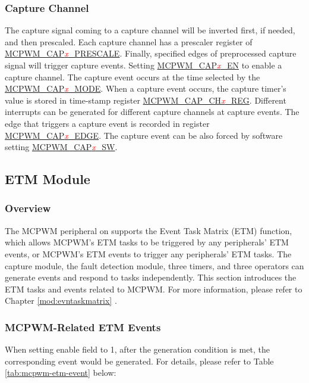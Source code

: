 \documentclass[main\_\_EN.tex]{subfiles}
\begin{document}
\subsubsection{Capture Channel}
The capture signal coming to a capture channel will be inverted first, if needed, and then prescaled. Each capture channel has a prescaler register of \hyperref[fielddesc:MCPWMCAP0PRESCALE]{MCPWM\_CAP\textcolor{red}{\it{x}}\_PRESCALE}. Finally, specified edges of preprocessed capture signal will trigger capture events. Setting \hyperref[fielddesc:MCPWMCAP0EN]{MCPWM\_CAP\textcolor{red}{\it{x}}\_EN} to enable a capture channel. The capture event occurs at the time selected by the \hyperref[fielddesc:MCPWMCAP0MODE]{MCPWM\_CAP\textcolor{red}{\it{x}}\_MODE}. When a capture event occurs, the capture timer's value is stored in time-stamp register \hyperref[regdesc:MCPWMCAPCH0REG]{MCPWM\_CAP\_CH\textcolor{red}{\it{x}}\_REG}. Different interrupts can be generated for different capture channels at capture events. The edge that triggers a capture event is recorded in register \hyperref[fielddesc:MCPWMCAP0EDGE]{MCPWM\_CAP\textcolor{red}{\it{x}}\_EDGE}. The capture event can be also forced by software setting \hyperref[fielddesc:MCPWMCAP0SW]{MCPWM\_CAP\textcolor{red}{\it{x}}\_SW}.

\subsection{ETM Module}

\subsubsection{Overview}
The MCPWM peripheral on \chipname{} supports the Event Task Matrix (ETM) function, which allows MCPWM's ETM tasks to be triggered by any peripherals' ETM events, or MCPWM's ETM events to trigger any peripherals' ETM tasks. The capture module, the fault detection module, three timers, and three operators can generate events and respond to tasks independently. This section introduces the ETM tasks and events related to MCPWM. For more information, please refer to Chapter \ref{mod:evntaskmatrix} .
\subsubsection{MCPWM-Related ETM Events}

When setting enable field to 1, after the generation condition is met, the corresponding event would be generated. For details, please refer to Table \ref{tab:mcpwm-etm-event} below:
\end{document}
